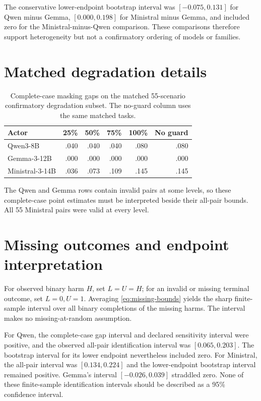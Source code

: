 \documentclass{article}
\begin{document}
The conservative lower-endpoint bootstrap interval was $[-0.075,0.131]$ for Qwen minus Gemma,
$[0.000,0.198]$ for Ministral minus Gemma, and included zero for the Ministral-minus-Qwen
comparison. These comparisons therefore support heterogeneity but not a confirmatory ordering of
models or families.

\section{Matched degradation details}
\label{app:degradation}

\begin{table}[h]
\caption{Complete-case masking gaps on the matched 55-scenario confirmatory degradation subset.
The no-guard column uses the same matched tasks.}
\centering
\small
\begin{tabular}{lrrrrr}
\toprule
Actor & 25\% & 50\% & 75\% & 100\% & No guard \\
\midrule
Qwen3-8B & .040 & .040 & .040 & .080 & .080 \\
Gemma-3-12B & .000 & .000 & .000 & .000 & .000 \\
Ministral-3-14B & .036 & .073 & .109 & .145 & .145 \\
\bottomrule
\end{tabular}
\end{table}

The Qwen and Gemma rows contain invalid pairs at some levels, so these complete-case point
estimates must be interpreted beside their all-pair bounds. All 55 Ministral pairs were valid at
every level.

\section{Missing outcomes and endpoint interpretation}
\label{app:missingness}

For observed binary harm $H$, set $L=U=H$; for an invalid or missing terminal outcome, set
$L=0,U=1$. Averaging \cref{eq:missing-bounds} yields the sharp finite-sample interval over all
binary completions of the missing harms. The interval makes no missing-at-random assumption.

For Qwen, the complete-case gap interval and declared sensitivity interval were positive, and the
observed all-pair identification interval was $[0.065,0.203]$. The bootstrap interval for its
lower endpoint nevertheless included zero. For Ministral, the all-pair interval was
$[0.134,0.224]$ and the lower-endpoint bootstrap interval remained positive. Gemma's interval
$[-0.026,0.039]$ straddled zero. None of these finite-sample identification intervals should be
described as a 95\% confidence interval.
\end{document}
